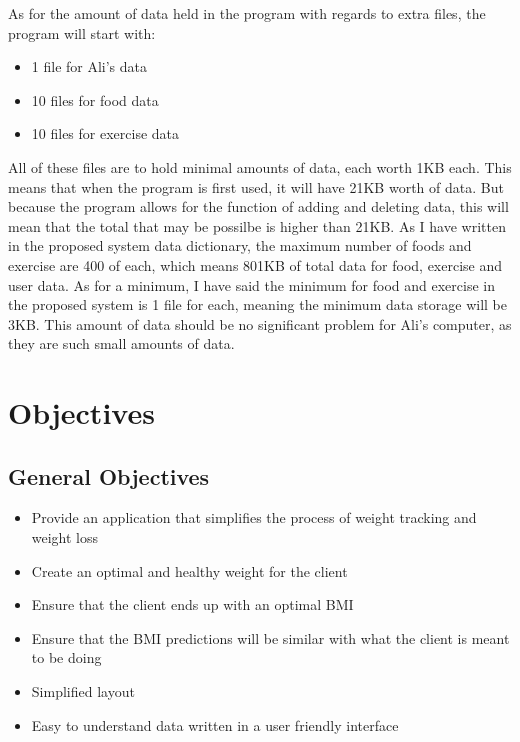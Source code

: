 As for the amount of data held in the program with regards to extra files, the program will start with:

\begin{itemize}
\item 1 file for Ali's data
\item 10 files for food data
\item 10 files for exercise data
\end{itemize}

All of these files are to hold minimal amounts of data, each worth 1KB each. This means that when the program is first used, it will have 21KB worth of data. But because the program allows for the function of adding and deleting data, this will mean that the total that may be possilbe is higher than 21KB. As I have written in the proposed system data dictionary, the maximum number of foods and exercise are 400 of each, which means 801KB of total data for food, exercise and user data. As for a minimum, I have said the minimum for food and exercise in the proposed system is 1 file for each, meaning the minimum data storage will be 3KB. This amount of data should be no significant problem for Ali's computer, as they are such small amounts of data.

\section{Objectives}

\subsection{General Objectives}

\begin{itemize}
\item Provide an application that simplifies the process of weight tracking and weight loss
\item Create an optimal and healthy weight for the client
\item Ensure that the client ends up with an optimal BMI
\item Ensure that the BMI predictions will be similar with what the client is meant to be doing
\item Simplified layout
\item Easy to understand data written in a user friendly interface
\end{itemize}


